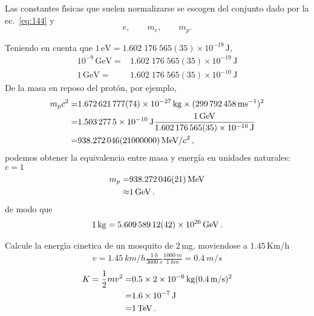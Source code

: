 Las constantes f\'\i sicas que suelen normalizarse se escogen del conjunto dado por la ec.~\eqref{eq:144} y
\begin{equation}
  \label{eq:145}
  e,\qquad m_e,\qquad m_p.
\end{equation}
\begin{frame}
Teniendo en cuenta que $1\,\text{eV}=1.602\;176\;565(35)\times10^{-19}\,\text{J}$,
\begin{align}
  10^{-9}\,\text{GeV}=&1.602\;176\;565(35)\times10^{-19}\,\text{J}\nonumber\\
  1\,\text{GeV}=&1.602\;176\;565(35)\times10^{-10}\,\text{J}
\end{align}
De la masa en reposo del protón, por ejemplo, 
\begin{align*}
  m_pc^2=&\SI{1.672621777 +- 0.000000074E-27}{kg}\times (\SI{299792458}{ms^{-1}})^2\nonumber\\
  =&\SI{1.5032775e-10}{J}\frac{\SI{1}{GeV}}{\SI{1.602176565 +- .000000035E-10}{J}}\nonumber\\
  =&\SI{938.272046+-21}{MeV}/c^2\,,
\end{align*}
podemos obtener la equivalencia entre masa y energía en unidades naturales: $c=1$
\begin{align}
m_p=&\SI{938.272046+-0.000021}{MeV}\nonumber\\
  \approx& \SI{1}{GeV}\,.
\end{align}
de modo que
\begin{align}
  \SI{1}{kg}=\SI{5.60958912 +- 0.00000042E26}{GeV}\,.
\end{align}

\begin{example}
  Calcule la energ\'\i a cinetica de un mosquito de $2\,$mg, moviendose a $1.45\,$Km/h
  \begin{align}
    v= \SI{1.45}{km/h}\frac{\SI{1}{h}}{\SI{3600}{s}}\frac{\SI{1000}{m}}{\SI{1}{km}}=\SI{0.4}{m/s}  
\end{align}
\begin{align}
  K=\frac{1}{2}mv^2=&0.5\times \SI{2E-6}{kg}(\SI{0.4}{m/s})^2 \nonumber\\
                   =&\SI{1.6E-7}{J}\nonumber\\
                   =&\SI{1}{TeV}\,.
\end{align}

\end{example}


\end{frame}

